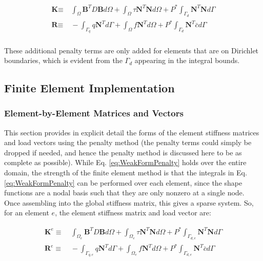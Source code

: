 \documentclass[10pt]{article}
\begin{document}
\begin{equation}
\begin{aligned}
\textbf{K}\equiv&\ \int_{\Omega}\textbf{B}^TD\textbf{B} d\Omega+\int_{\Omega}\tau \textbf{N}^T\textbf{N} d\Omega+P^{*}\int_{\Gamma_d}\textbf{N}^T\textbf{N} d\Gamma\\
\textbf{R}\equiv&\ -\int_{\Gamma_q}q\textbf{N}^Td\Gamma+\int_{\Omega}f\textbf{N}^Td\Omega+P^{*}\int_{\Gamma_d}\textbf{N}^T\bar{c}d\Gamma\\
\end{aligned}
\end{equation}

These additional penalty terms are only added for elements that are on Dirichlet boundaries, which is evident from the \(\Gamma_d\) appearing in the integral bounds.


\subsection{Finite Element Implementation}
\label{sec:FEElement}

\subsubsection{Element-by-Element Matrices and Vectors}

This section provides in explicit detail the forms of the element stiffness matrices and load vectors using the penalty method (the penalty terms could simply be dropped if needed, and hence the penalty method is discussed here to be as complete as possible). While Eq. \eqref{eq:WeakFormPenalty} holds over the entire domain, the strength of the finite element method is that the integrals in Eq. \eqref{eq:WeakFormPenalty} can be performed over each element, since the shape functions are a nodal basis such that they are only nonzero at a single node. Once assembling into the global stiffness matrix, this gives a sparse system. So, for an element \(e\), the element stiffness matrix and load vector are:

\begin{tcolorbox}
\begin{equation}
\label{eq:FEWeakForm_element}
\begin{aligned}
\textbf{K}^e\equiv&\ \int_{\Omega_e}\textbf{B}^TD\textbf{B} d\Omega+\int_{\Omega_e}\tau \textbf{N}^T\textbf{N} d\Omega+P^{*}\int_{\Gamma_{d,e}}\textbf{N}^T\textbf{N} d\Gamma\\
\textbf{R}^e\equiv&\ -\int_{\Gamma_{q,e}}q\textbf{N}^Td\Gamma+\int_{\Omega_e}f\textbf{N}^Td\Omega+P^{*}\int_{\Gamma_{d,e}}\textbf{N}^T\bar{c}d\Gamma\\
\end{aligned}
\end{equation}
\end{tcolorbox}
\end{document}
